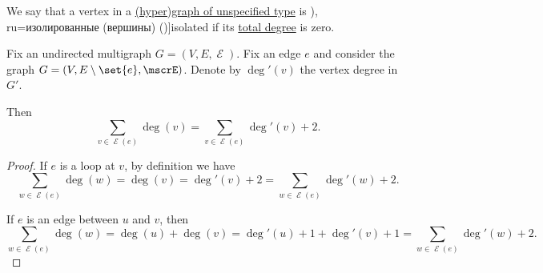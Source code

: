 \begin{definition}\label{def:isolated_vertex}
  We say that a vertex in a \hyperref[rem:graph_of_unspecified_type]{(hyper)graph of unspecified type} is \term[bg=изолирани (върхове) (\cite[8]{Мирчев2001Графи}), ru=изолированные (вершины) (\cite[26]{ЕмеличевИПр1990ТеорияГрафов})]{isolated} if its \hyperref[def:graph_cardinality/directed_degree]{total degree} is zero.
\end{definition}

\begin{lemma}\label{thm:sum_of_endpoint_degrees}
  Fix an undirected multigraph \( G = (V, E, \mscrE) \). Fix an edge \( e \) and consider the graph \( G = (V, E \setminus \set{ e }, \mscrE) \). Denote by \( \deg'(v) \) the vertex degree in \( G' \).

  Then
  \begin{equation}\label{eq:thm:sum_of_endpoint_degrees}
    \sum_{v \in \mscrE(e)} \deg(v) = \sum_{v \in \mscrE(e)} \deg'(v) + 2.
  \end{equation}
\end{lemma}
\begin{proof}
  If \( e \) is a loop at \( v \), by definition we have
  \begin{equation*}
    \sum_{w \in \mscrE(e)} \deg(w) = \deg(v) = \deg'(v) + 2 = \sum_{w \in \mscrE(e)} \deg'(w) + 2.
  \end{equation*}

  If \( e \) is an edge between \( u \) and \( v \), then
  \begin{equation*}
    \sum_{w \in \mscrE(e)} \deg(w)
    =
    \deg(u) + \deg(v)
    =
    \deg'(u) + 1 + \deg'(v) + 1
    =
    \sum_{w \in \mscrE(e)} \deg'(w) + 2.
  \end{equation*}
\end{proof}

